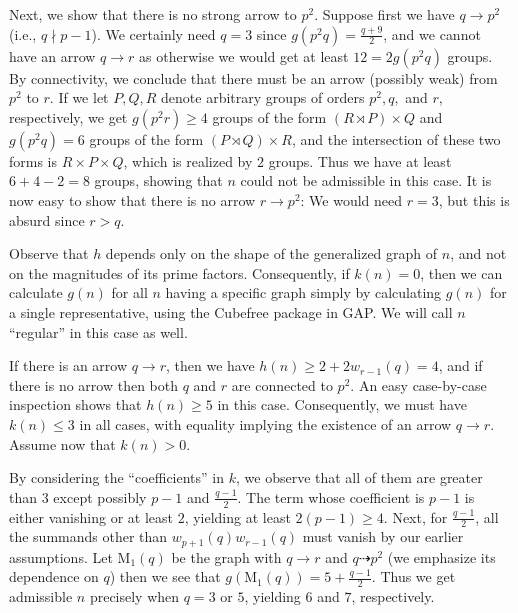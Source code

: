 \documentclass{article}
\newcommand{\m}[1]{\text{M}_{#1}}
\theoremstyle{plain}
\theoremstyle{definition}
\begin{document}
Next, we show that there is no strong arrow to $p^2$. Suppose first we have $q \rightarrow p^2$ (i.e., $q \nmid p - 1$). We certainly need $q = 3$ since $g(p^2 q) = \frac{q + 9}{2}$, and we cannot have an arrow $q \rightarrow r$ as otherwise we would get at least $12 = 2g(p^2 q)$ groups. By connectivity, we conclude that there must be an arrow (possibly weak) from $p^2$ to $r$. If we let $P, Q, R$ denote arbitrary groups of orders $p^2, q,$ and $r$, respectively, we get $g(p^2 r) \ge 4$ groups of the form $(R \rtimes P) \times Q$ and $g(p^2 q) = 6$ groups of the form $(P \rtimes Q) \times R$, and the intersection of these two forms is $R \times P \times Q$, which is realized by $2$ groups. Thus we have at least $6 + 4 - 2 = 8$ groups, showing that $n$ could not be admissible in this case. It is now easy to show that there is no arrow $r \rightarrow p^2$: We would need $r = 3$, but this is absurd since $r > q$.

Observe that $h$ depends only on the shape of the generalized graph of $n$, and not on the magnitudes of its prime factors. Consequently, if $k(n) = 0$, then we can calculate $g(n)$ for all $n$ having a specific graph simply by calculating $g(n)$ for a single representative, using the Cubefree package in GAP{\cite{cubefreepkg}}. We will call $n$ ``regular'' in this case as well.

If there is an arrow $q \rightarrow r$, then we have $h(n) \ge 2 + 2w_{r - 1}(q) = 4$, and if there is no arrow then both $q$ and $r$ are connected to $p^2$. An easy case-by-case inspection shows that $h(n) \ge 5$ in this case. Consequently, we must have $k(n) \le 3$ in all cases, with equality implying the existence of an arrow $q \rightarrow r$. Assume now that $k(n) > 0.$

By considering the ``coefficients'' in $k$, we observe that all of them are greater than $3$ except possibly $p - 1$ and $\frac{q - 1}{2}$. The term whose coefficient is $p - 1$ is either vanishing or at least $2$, yielding at least $2(p - 1) \ge 4$. Next, for $\frac{q - 1}{2}$, all the summands other than $w_{p + 1}(q)w_{r - 1}(q)$ must vanish by our earlier assumptions. Let $\m1(q)$ be the graph with $q \rightarrow r$ and $q \dashrightarrow p^2$ (we emphasize its dependence on $q$) then we see that $g(\m1(q)) = 5 + \frac{q - 1}{2}$. Thus we get admissible $n$ precisely when $q = 3$ or $5$, yielding $6$ and $7$, respectively.
\end{document}
